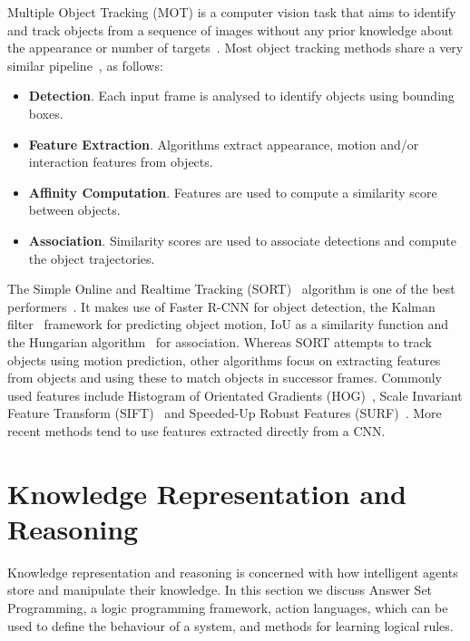 \documentclass[../interim.tex]{subfiles}
\begin{document}
Multiple Object Tracking (MOT) is a computer vision task that aims to identify and track objects from a sequence of images without any prior knowledge about the appearance or number of targets~\cite{obj-tracking-survey}. Most object tracking methods share a very similar pipeline~\cite{obj-tracking-survey}, as follows:
\begin{itemize}
  \item \textbf{Detection}. Each input frame is analysed to identify objects using bounding boxes.

  \item \textbf{Feature Extraction}. Algorithms extract appearance, motion and/or interaction features from objects.

  \item \textbf{Affinity Computation}. Features are used to compute a similarity score between objects.

  \item \textbf{Association}. Similarity scores are used to associate detections and compute the object trajectories.
\end{itemize}

The Simple Online and Realtime Tracking (SORT)~\cite{sort-obj-tracking} algorithm is one of the best performers~\cite{obj-tracking-survey}. It makes use of Faster R-CNN for object detection, the Kalman filter~\cite{kalman-filter} framework for predicting object motion, IoU as a similarity function and the Hungarian algorithm~\cite{hungarian-algo} for association. Whereas SORT attempts to track objects using motion prediction, other algorithms focus on extracting features from objects and using these to match objects in successor frames. Commonly used features include Histogram of Orientated Gradients (HOG)~\cite{hog-features}, Scale Invariant Feature Transform (SIFT)~\cite{sift} and Speeded-Up Robust Features (SURF)~\cite{surf}. More recent methods tend to use features extracted directly from a CNN.


\section{Knowledge Representation and Reasoning}

Knowledge representation and reasoning is concerned with how intelligent agents store and manipulate their knowledge. In this section we discuss Answer Set Programming, a logic programming framework, action languages, which can be used to define the behaviour of a system, and methods for learning logical rules.
\end{document}
